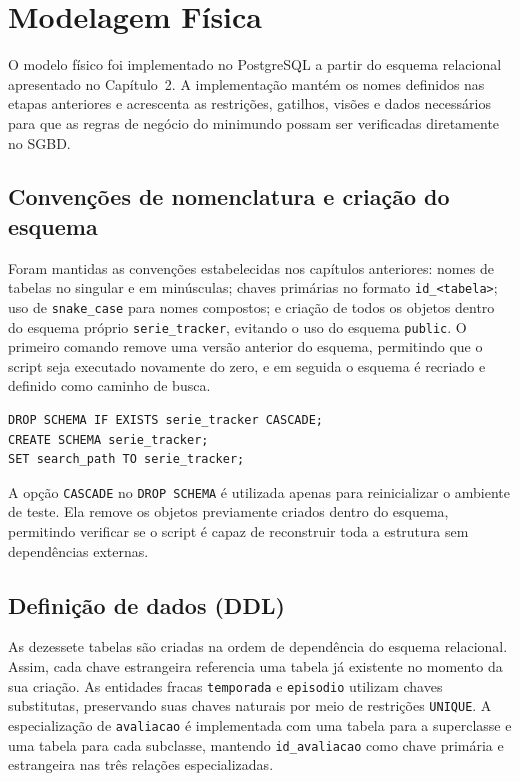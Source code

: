 \documentclass[a4paper,12pt,oneside,openany]{book}
\newcommand{\id}[1]{\texttt{#1}}
\begin{document}
\chapter{Modelagem Física}\label{cap:fisica}

O modelo físico foi implementado no PostgreSQL a partir do esquema relacional
apresentado no Capítulo~2. A implementação mantém os nomes definidos nas etapas
anteriores e acrescenta as restrições, gatilhos, visões e dados necessários para
que as regras de negócio do minimundo possam ser verificadas diretamente no
SGBD.

\section{Convenções de nomenclatura e criação do esquema}

Foram mantidas as convenções estabelecidas nos capítulos anteriores: nomes de
tabelas no singular e em minúsculas; chaves primárias no formato
\id{id\_<tabela>}; uso de \id{snake\_case} para nomes compostos; e criação de
todos os objetos dentro do esquema próprio \id{serie\_tracker}, evitando o uso
do esquema \id{public}. O primeiro comando remove uma versão anterior do
esquema, permitindo que o script seja executado novamente do zero, e em seguida
o esquema é recriado e definido como caminho de busca.

\begin{lstlisting}[caption={Criação do esquema},label={lst:schema}]
DROP SCHEMA IF EXISTS serie_tracker CASCADE;
CREATE SCHEMA serie_tracker;
SET search_path TO serie_tracker;
\end{lstlisting}

A opção \id{CASCADE} no \id{DROP SCHEMA} é utilizada apenas para reinicializar o
ambiente de teste. Ela remove os objetos previamente criados dentro do esquema,
permitindo verificar se o script é capaz de reconstruir toda a estrutura sem
dependências externas.

\section{Definição de dados (DDL)}

As dezessete tabelas são criadas na ordem de dependência do esquema relacional.
Assim, cada chave estrangeira referencia uma tabela já existente no momento da
sua criação. As entidades fracas \id{temporada} e \id{episodio} utilizam chaves
substitutas, preservando suas chaves naturais por meio de restrições
\id{UNIQUE}. A especialização de \id{avaliacao} é implementada com uma tabela
para a superclasse e uma tabela para cada subclasse, mantendo \id{id\_avaliacao}
como chave primária e estrangeira nas três relações especializadas.
\end{document}
